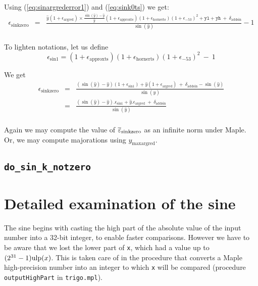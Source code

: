 Using (\ref{eq:sinargrederror1}) and (\ref{eq:sink0ts}) we get:
\begin{eqnarray*}
  \epsilon_{\mathrm{sinkzero}} 
  &=& \frac{\hat{y}(1+\epsilon_{\mathrm{argred}})\times\frac{\sin(\hat{y})-\hat{y}}{\hat{y}}(1+\epsilon_{\mathrm{approxts}})(1+\epsilon_{\mathrm{hornerts}})(1+\epsilon_{-53})^2 + \mathtt{yl} + \mathtt{yh}    \ +\  \delta_{\mathrm{addsin}} }{\sin(\hat{y})} -1\\
\end{eqnarray*}

To lighten notations, let us define 
\begin{equation}
 \epsilon_{\mathrm{sin1}} = (1+\epsilon_{\mathrm{approxts}})(1+\epsilon_{\mathrm{hornerts}})(1+\epsilon_{-53})^2 \ -\ 1
  \label{eq:epssin1}
\end{equation}

We get
\begin{eqnarray*}
  \epsilon_{\mathrm{sinkzero}} 
  &=& \frac{(\sin(\hat{y})-\hat{y})(1+\epsilon_{\mathrm{sin1}}) + \hat{y}(1+\epsilon_{\mathrm{argred}})    \ +\   \delta_{\mathrm{addsin}} - \sin(\hat{y})}{\sin(\hat{y})}\\
  &=& \frac{(\sin(\hat{y})-\hat{y}).\epsilon_{\mathrm{sin1}} + \hat{y}.\epsilon_{\mathrm{argred}}    \ +\ \delta_{\mathrm{addsin}}}{\sin(\hat{y})}\\
\label{eq:sinkzero}
\end{eqnarray*}

Again we may compute the value of ${\overline{\varepsilon}}_{\mathrm{sinkzero}}$ as an
infinite norm under Maple. Or, we may compute majorations using
$y_{\mathrm{maxargred}}$.

 



\subsection{\texttt{do\_sin\_k\_notzero}}



\section{Detailed examination of the sine}

The sine begins with casting the high part of the absolute value of
the input number into a 32-bit integer, to enable faster comparisons.
However we have to be aware that we lost the lower part of \texttt{x},
which had a value up to $(2^{31}-1)\mbox{ulp}(x)$. This is taken care of in
the procedure that converts a Maple high-precision number into an
integer to which \texttt{x} will be compared (procedure
\texttt{outputHighPart} in \texttt{trigo.mpl}).

